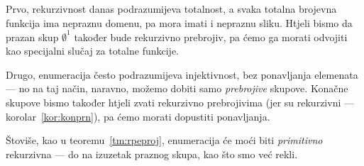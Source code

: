Prvo, rekurzivnost danas podrazumijeva totalnost, a svaka totalna brojevna funkcija ima nepraznu domenu, pa mora imati i nepraznu sliku. Htjeli bismo da prazan skup $\emptyset^1$ također bude rekurzivno prebrojiv, pa ćemo ga morati odvojiti kao specijalni slučaj za totalne funkcije.

Drugo, enumeracija često podrazumijeva injektivnost, bez ponavljanja elemenata --- no na taj način, naravno, možemo dobiti samo \emph{prebrojive} skupove. Konačne skupove bismo također htjeli zvati rekurzivno prebrojivima (jer su rekurzivni --- korolar~\ref{kor:konprn}), pa ćemo morati dopustiti ponavljanja.

Štoviše, kao u teoremu~\ref{tm:rpeproj}, enumeracija će moći biti \emph{primitivno} rekurzivna --- do na izuzetak praznog skupa, kao što smo već rekli.

